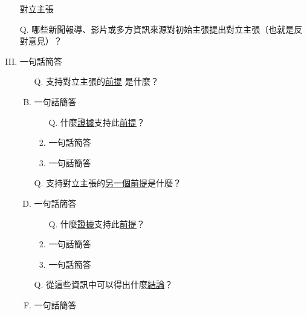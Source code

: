 \documentclass[a4paper, 12pt]{article}
\begin{document}
\begin{enumerate}[I.]
\begin{enumerate}[A.]
          \end{enumerate}
    \item [] {\color{red}對立主張}
    \item[Q.] 哪些新聞報導、影片或多方資訊來源對初始主張提出對立主張（也就是反對意見）？
    \item {\color{gray}一句話簡答} %
          \begin{enumerate}[A.]
              \item [Q.]支持{\color{red}對立主張}的{\underline{前提}} 是什麼？
              \item {\color{gray}一句話簡答} %
                    \begin{enumerate}[1.]
                        \item [Q.] 什麼{\underline{證據}}支持此{\underline{前提}}？
                        \item {\color{gray}一句話簡答} %
                        \item {\color{gray}一句話簡答} %
                    \end{enumerate}
              \item [Q.]支持{\color{red}對立主張}的{\underline{另一個前提}}是什麼？
              \item{\color{gray}一句話簡答} %
                    \begin{enumerate}[1.]
                        \item [Q.] 什麼{\underline{證據}}支持此{\underline{前提}}？
                        \item {\color{gray}一句話簡答} %
                        \item {\color{gray}一句話簡答} %
                    \end{enumerate}
              \item [Q.]從這些資訊中可以得出什麼{\underline{結論}}？
              \item {\color{gray}一句話簡答} %
          \end{enumerate}


\end{enumerate}
\end{document}
